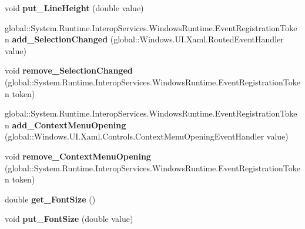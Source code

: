 \begin{DoxyCompactItemize}
void {\bfseries put\+\_\+\+Line\+Height} (double value)
\item 
\mbox{\label{interface_windows_1_1_u_i_1_1_xaml_1_1_controls_1_1_i_text_block_af727476045815cf9cc9cf515d6d80a24}} 
global\+::\+System.\+Runtime.\+Interop\+Services.\+Windows\+Runtime.\+Event\+Registration\+Token {\bfseries add\+\_\+\+Selection\+Changed} (global\+::\+Windows.\+U\+I.\+Xaml.\+Routed\+Event\+Handler value)
\item 
\mbox{\label{interface_windows_1_1_u_i_1_1_xaml_1_1_controls_1_1_i_text_block_aa5f21aa6c1bfe8efdedfd5dbd95e003a}} 
void {\bfseries remove\+\_\+\+Selection\+Changed} (global\+::\+System.\+Runtime.\+Interop\+Services.\+Windows\+Runtime.\+Event\+Registration\+Token token)
\item 
\mbox{\label{interface_windows_1_1_u_i_1_1_xaml_1_1_controls_1_1_i_text_block_a1d8100da7fff6292db5c7e88860bb898}} 
global\+::\+System.\+Runtime.\+Interop\+Services.\+Windows\+Runtime.\+Event\+Registration\+Token {\bfseries add\+\_\+\+Context\+Menu\+Opening} (global\+::\+Windows.\+U\+I.\+Xaml.\+Controls.\+Context\+Menu\+Opening\+Event\+Handler value)
\item 
\mbox{\label{interface_windows_1_1_u_i_1_1_xaml_1_1_controls_1_1_i_text_block_a68593635321b0b8cd439a3d341f86485}} 
void {\bfseries remove\+\_\+\+Context\+Menu\+Opening} (global\+::\+System.\+Runtime.\+Interop\+Services.\+Windows\+Runtime.\+Event\+Registration\+Token token)
\item 
\mbox{\label{interface_windows_1_1_u_i_1_1_xaml_1_1_controls_1_1_i_text_block_a9912fea3536da888623b2947225a9d6d}} 
double {\bfseries get\+\_\+\+Font\+Size} ()
\item 
\mbox{\label{interface_windows_1_1_u_i_1_1_xaml_1_1_controls_1_1_i_text_block_a6bee3c5a6d60cdfb17958f446638701f}} 
void {\bfseries put\+\_\+\+Font\+Size} (double value)
\item 

\end{DoxyCompactItemize}
